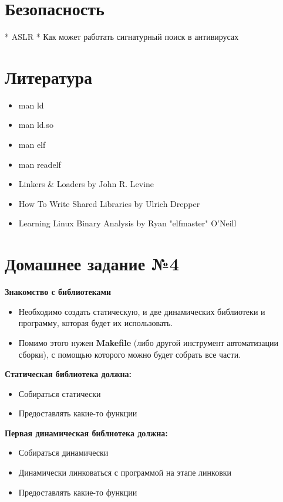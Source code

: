 \documentclass[../../lectures.tex]{subfiles}
\begin{document}
\section{Безопасность}
  * ASLR
  * Как может работать сигнатурный поиск в антивирусах

\newpage
\section{Литература}
\begin{itemize}
    \item man ld
    \item man ld.so
    \item man elf
    \item man readelf
    \item Linkers \& Loaders by John R. Levine
    \item How To Write Shared Libraries by Ulrich Drepper
    \item Learning Linux Binary Analysis by Ryan "elfmaster" O'Neill
\end{itemize}

\section{Домашнее задание №4}
\textbf{Знакомство с библиотеками}
\begin{itemize}
    \item Необходимо создать статическую, и две динамических библиотеки и программу, которая будет их использовать.
    \item Помимо этого нужен \textbf{Makefile} (либо другой инструмент автоматизации сборки), с помощью которого можно будет собрать все части.
\end{itemize}

\textbf{Статическая библиотека должна:}
\begin{itemize}
    \item Собираться статически
    \item Предоставлять какие-то функции
\end{itemize}

\textbf{Первая динамическая библиотека должна:}
\begin{itemize}
    \item Собираться динамически
    \item Динамически линковаться с программой на этапе линковки
    \item Предоставлять какие-то функции
\end{itemize}
\end{document}
